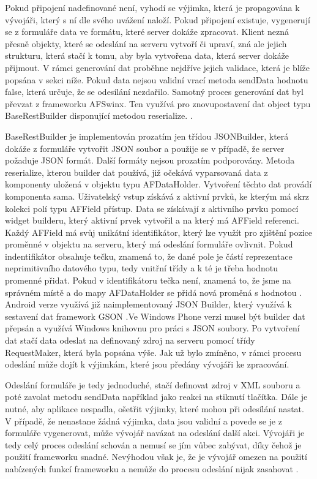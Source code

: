 Pokud připojení nadefinované není, vyhodí se výjimka, která je propagována k vývojáři, který s ní dle svého uvážení naloží. Pokud připojení existuje, vygenerují se z formuláře data ve formátu, které server dokáže zpracovat. Klient nezná přesně objekty, které se odeslání na serveru vytvoří či upraví, zná ale jejich strukturu, která stačí k tomu, aby byla vytvořena data, která server dokáže přijmout. V rámci generování dat proběhne nejdříve jejich validace, která je blíže popsána v sekci níže. Pokud data nejsou validní vrací metoda sendData hodnotu false, která určuje, že se odesílání nezdařilo. Samotný proces generování dat byl převzat z frameworku AFSwinx. Ten využívá pro znovupostavení dat object typu BaseRestBuilder disponující metodou reserialize. \cite{tomasek-thesis}. 

BaseRestBuilder je implementován prozatím jen třídou JSONBuilder, která dokáže z formuláře vytvořit JSON soubor a použije se v případě, že server požaduje JSON formát. Další formáty nejsou prozatím podporovány. Metoda reserialize, kterou builder dat používá, již očekává vyparsovaná data z komponenty uložená v objektu typu AFDataHolder. Vytvoření těchto dat provádí komponenta sama. Uživatelský vstup získává z aktivní prvků, ke kterým má skrz kolekci polí typu AFField přístup. Data se získávají z aktivního prvku pomocí widget builderu, který aktivní prvek vytvořil a na který má AFField referenci.  Každý AFField má svůj unikátní identifikátor, který lze využít pro zjištění pozice proměnné v objektu na serveru, který má odeslání formuláře ovlivnit. Pokud indentifikátor obsahuje tečku, znamená to, že dané pole je částí reprezentace neprimitivního datového typu, tedy vnitřní třídy a k té je třeba hodnotu promenné přidat. Pokud v identifikátoru tečka není, znamená to, že jsme na správném místě a do mapy AFDataHolder se přidá nová proměná s hodnotou \cite{tomasek-thesis}. Android verze využívá již naimplementovaný JSON Builder, který využívá k sestavení dat framework GSON \cite{gson}.Ve Windows Phone verzi musel být builder dat přepsán a využívá Windows knihovnu pro práci s JSON soubory. Po vytvoření dat stačí data odeslat na definovaný zdroj na serveru pomocí třídy RequestMaker, která byla popsána výše. Jak už bylo zmíněno, v rámci procesu odeslání může dojít k výjimkám, které jsou předány vývojáři ke zpracování. 

Odeslání formuláře je tedy jednoduché, stačí definovat zdroj v XML souboru a poté zavolat metodu sendData například jako reakci na stiknutí tlačítka. Dále je nutné, aby aplikace nespadla, ošetřit výjimky, které mohou při odesílání nastat. V případě, že nenastane žádná výjimka, data jsou validní a povede se je z formuláře vygenerovat, může vývojář navázat na odeslání další akci. Vývojáři je tedy celý proces odeslání schován a nemusí se jím vůbec zabývat, díky čehož je použití frameworku snadné. Nevýhodou však je, že je vývojář omezen na použití nabízených funkcí frameworku a nemůže do procesu odeslání nijak zasahovat \cite{tomasek-thesis}. 

